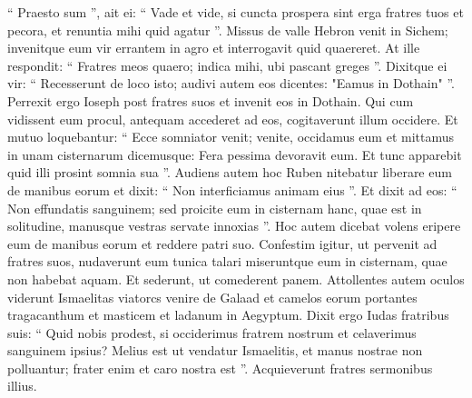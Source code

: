 \begin{biblechapter}
\begin{biblechapter}
\begin{biblechapter}
\begin{biblechapter}
\begin{biblechapter}
\begin{biblechapter}
\begin{biblechapter}
\begin{biblechapter}
\begin{biblechapter}
\begin{biblechapter}
\begin{biblechapter}
\begin{biblechapter}
\begin{biblechapter}
\begin{biblechapter}
\begin{biblechapter}
\begin{biblechapter}
\begin{biblechapter}
\begin{biblechapter}
\begin{biblechapter}
\begin{biblechapter}
\begin{biblechapter}
\begin{biblechapter}
\begin{biblechapter}
\begin{biblechapter}
\begin{biblechapter}
\begin{biblechapter}
\begin{biblechapter}
\begin{biblechapter}
\begin{biblechapter}
\begin{biblechapter}
\begin{biblechapter}
\begin{biblechapter}
\begin{biblechapter}
\begin{biblechapter}
\begin{biblechapter}
\begin{biblechapter}
\begin{biblechapter}
\verse “ Praesto sum ”, ait ei: “ Vade et vide, si cuncta prospera sint erga fratres tuos et pecora, et renuntia mihi quid agatur ”. Missus de valle Hebron venit in Sichem; 
\verse invenitque eum vir errantem in agro et interrogavit quid quaereret. 
\verse At ille respondit: “ Fratres meos quaero; indica mihi, ubi pascant greges ”. 
\verse Dixitque ei vir: “ Recesserunt de loco isto; audivi autem eos dicentes: "Eamus in Dothain" ”. Perrexit ergo Ioseph post fratres suos et invenit eos in Dothain.
 \verse Qui cum vidissent eum procul, antequam accederet ad eos, cogitaverunt illum occidere. 
\verse Et mutuo loquebantur: “ Ecce somniator venit; 
\verse venite, occidamus eum et mittamus in unam cisternarum dicemusque: Fera pessima devoravit eum. Et tunc apparebit quid illi prosint somnia sua ”.
 \verse Audiens autem hoc Ruben nitebatur liberare eum de manibus eorum et dixit: 
 \verse “ Non interficiamus animam eius ”. Et dixit ad eos: “ Non effundatis sanguinem; sed proicite eum in cisternam hanc, quae est in solitudine, manusque vestras servate innoxias ”. Hoc autem dicebat volens eripere eum de manibus eorum et reddere patri suo. 
\verse Confestim igitur, ut pervenit ad fratres suos, nudaverunt eum tunica talari 
\verse miseruntque eum in cisternam, quae non habebat aquam.
 \verse Et sederunt, ut comederent panem. Attollentes autem oculos viderunt Ismaelitas viatorcs venire de Galaad et camelos eorum portantes tragacanthum et masticem et ladanum in Aegyptum. 
\verse Dixit ergo Iudas fratribus suis: “ Quid nobis prodest, si occiderimus fratrem nostrum et celaverimus sanguinem ipsius? 
\verse Melius est ut vendatur Ismaelitis, et manus nostrae non polluantur; frater enim et caro nostra est ”. Acquieverunt fratres sermonibus illius. 

\end{biblechapter}
\end{biblechapter}
\end{biblechapter}
\end{biblechapter}
\end{biblechapter}
\end{biblechapter}
\end{biblechapter}
\end{biblechapter}
\end{biblechapter}
\end{biblechapter}
\end{biblechapter}
\end{biblechapter}
\end{biblechapter}
\end{biblechapter}
\end{biblechapter}
\end{biblechapter}
\end{biblechapter}
\end{biblechapter}
\end{biblechapter}
\end{biblechapter}
\end{biblechapter}
\end{biblechapter}
\end{biblechapter}
\end{biblechapter}
\end{biblechapter}
\end{biblechapter}
\end{biblechapter}
\end{biblechapter}
\end{biblechapter}
\end{biblechapter}
\end{biblechapter}
\end{biblechapter}
\end{biblechapter}
\end{biblechapter}
\end{biblechapter}
\end{biblechapter}
\end{biblechapter}
